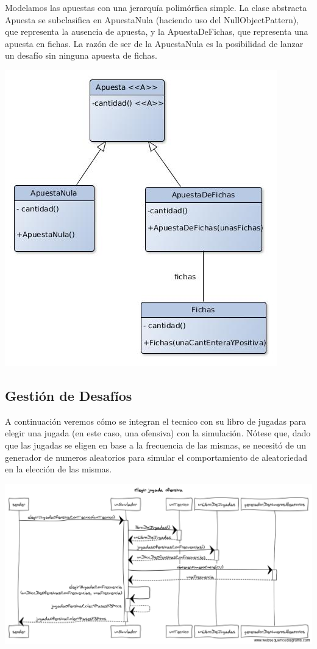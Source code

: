 Modelamos las apuestas con una jerarquía polimórfica simple. La clase abstracta Apuesta se subclasifica en ApuestaNula (haciendo uso del NullObjectPattern), que representa la ausencia de apuesta, y la ApuestaDeFichas, que representa una apuesta en fichas. La razón de ser de la ApuestaNula es la posibilidad de lanzar un desafío sin ninguna apuesta de fichas.\\
\begin{center}
\includegraphics[scale=0.4]{diseno/apuestas.jpg}
\end{center}

\subsection{Gestión de Desafíos}



A continuación veremos cómo se integran el tecnico con su libro de jugadas para elegir una jugada (en este caso, una ofensiva) con la simulación. Nótese que, dado que las jugadas se eligen en base a la frecuencia de las mismas, se necesitó de un generador de numeros aleatorios para simular el comportamiento de aleatoriedad en la elección de las mismas. 
\begin{center}
\includegraphics[scale=0.30]{diseno/Elegir_jugada_ofensiva.png} 
\end{center}


